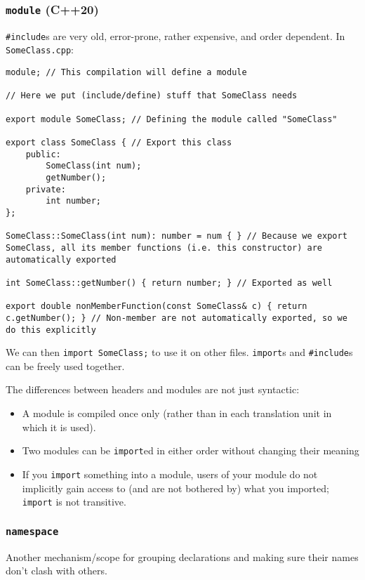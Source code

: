 \documentclass[8pt, table, xcdraw]{article}%
\begin{document}
\subsubsection{\lstinline{module} (C++20)} \label{modules}

\lstinline{#include}s are very old, error-prone,  rather expensive, and order dependent. In \lstinline{SomeClass.cpp}:

\begin{lstlisting}
module; // This compilation will define a module

// Here we put (include/define) stuff that SomeClass needs

export module SomeClass; // Defining the module called "SomeClass"

export class SomeClass { // Export this class
    public:
        SomeClass(int num);
        getNumber();
    private:
        int number;
};

SomeClass::SomeClass(int num): number = num { } // Because we export SomeClass, all its member functions (i.e. this constructor) are automatically exported

int SomeClass::getNumber() { return number; } // Exported as well

export double nonMemberFunction(const SomeClass& c) { return c.getNumber(); } // Non-member are not automatically exported, so we do this explicitly
\end{lstlisting}

We can then \lstinline{import SomeClass;} to use it on other files. \lstinline{import}s and \lstinline{#include}s can be freely used together.

The differences between headers and modules are not just syntactic:
\begin{itemize}[leftmargin=15pt,noitemsep,nolistsep]
\item A module is compiled once only (rather than in each translation unit in which it is used).
\item Two modules can be \lstinline{import}ed in either order without changing their meaning
\item If you \lstinline{import} something into a module, users of your module do not implicitly gain access to (and are not bothered by) what you imported;  \lstinline{import} is not transitive.
\end{itemize}

\subsubsection{\lstinline{namespace}} \label{namespace}
Another mechanism/scope for grouping declarations and making sure their names don't clash with others.
\end{document}
